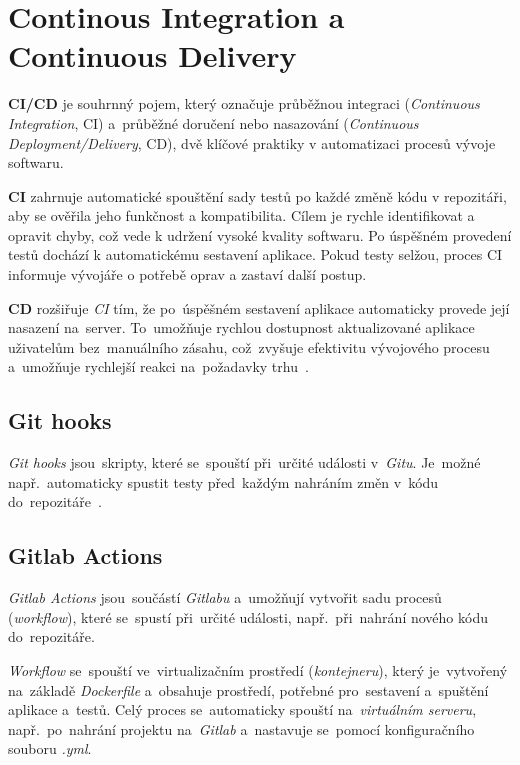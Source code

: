 \documentclass[11pt,a4paper]{report}
\begin{document}
        \section{Continous Integration a Continuous Delivery}
            \textbf{CI/CD} je souhrnný pojem, který označuje průběžnou integraci (\emph{Continuous Integration}, CI) a~průběžné doručení nebo nasazování (\emph{Continuous Deployment/Delivery}, CD), dvě klíčové praktiky v automatizaci procesů vývoje softwaru.

            \textbf{CI} zahrnuje automatické spouštění sady testů po každé změně kódu v repozitáři, aby se ověřila jeho funkčnost a kompatibilita. Cílem je rychle identifikovat a opravit chyby, což vede k udržení vysoké kvality softwaru. Po úspěšném provedení testů dochází k automatickému sestavení aplikace. Pokud testy selžou, proces CI informuje vývojáře o potřebě oprav a zastaví další postup.

            \textbf{CD} rozšiřuje \emph{CI} tím, že po~úspěšném sestavení aplikace automaticky provede její nasazení na~server. To~umožňuje rychlou dostupnost aktualizované aplikace uživatelům bez~manuálního zásahu, což~zvyšuje efektivitu vývojového procesu a~umožňuje rychlejší reakci na~požadavky trhu~\cite{graham2021ethical}.

            \subsection{Git hooks}
                \emph{Git hooks} jsou~skripty, které se~spouští při~určité události v~\emph{Gitu}. Je~možné např.~automaticky spustit testy před~každým nahráním změn v~kódu do~repozitáře~\cite{gitscmBook}.

            \subsection{Gitlab Actions}
                \emph{Gitlab Actions} jsou~součástí \emph{Gitlabu} a~umožňují vytvořit sadu procesů (\emph{workflow}), které se~spustí při~určité události, např.~při~nahrání nového kódu do~repozitáře.
                
                \emph{Workflow} se~spouští ve~virtualizačním prostředí (\emph{kontejneru}), který je~vytvořený na~základě \emph{Dockerfile} a~obsahuje prostředí, potřebné pro~sestavení a~spuštění aplikace a~testů. Celý proces se~automaticky spouští na~\emph{virtuálním serveru}, např.~po~nahrání projektu na~\emph{Gitlab} a~nastavuje se~pomocí konfiguračního souboru \emph{.yml}.
\end{document}
